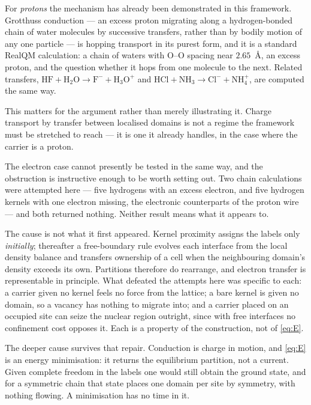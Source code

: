 \documentclass[11pt]{article}
\begin{document}
For \emph{protons} the mechanism has already been demonstrated in this framework. Grotthuss
conduction --- an excess proton migrating along a hydrogen-bonded chain of water molecules by
successive transfers, rather than by bodily motion of any one particle --- is hopping transport in
its purest form, and it is a standard RealQM calculation: a chain of waters with $\mathrm{O}$--$\mathrm{O}$
spacing near $2.65$~\AA{}, an excess proton, and the question whether it hops from one molecule to
the next. Related transfers, $\mathrm{HF}+\mathrm{H_2O}\to\mathrm{F^-}+\mathrm{H_3O^+}$ and
$\mathrm{HCl}+\mathrm{NH_3}\to\mathrm{Cl^-}+\mathrm{NH_4^+}$, are computed the same way.

This matters for the argument rather than merely illustrating it. Charge transport by transfer
between localised domains is not a regime the framework must be stretched to reach --- it is one it
already handles, in the case where the carrier is a proton.

The electron case cannot presently be tested in the same way, and the obstruction is instructive
enough to be worth setting out. Two chain calculations were attempted here --- five hydrogens with an
excess electron, and five hydrogen kernels with one electron missing, the electronic counterparts of
the proton wire --- and both returned nothing. Neither result means what it appears to.

The cause is not what it first appeared. Kernel proximity assigns the labels only \emph{initially};
thereafter a free-boundary rule evolves each interface from the local density balance and transfers
ownership of a cell when the neighbouring domain's density exceeds its own. Partitions therefore do
rearrange, and electron transfer is representable in principle. What defeated the attempts here was
specific to each: a carrier given no kernel feels no force from the lattice; a bare kernel is given no
domain, so a vacancy has nothing to migrate into; and a carrier placed on an occupied site can seize
the nuclear region outright, since with free interfaces no confinement cost opposes it. Each is a
property of the construction, not of \eqref{eq:E}.

The deeper cause survives that repair. Conduction is charge in motion, and \eqref{eq:E} is an energy
minimisation: it returns the equilibrium partition, not a current. Given complete freedom in the
labels one would still obtain the ground state, and for a symmetric chain that state places one
domain per site by symmetry, with nothing flowing. A minimisation has no time in it.
\end{document}
